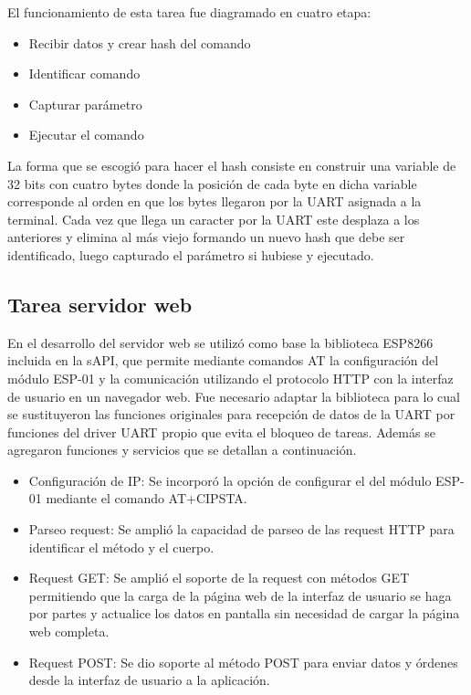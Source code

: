 El funcionamiento de esta tarea fue diagramado en cuatro etapa:
\begin{itemize}
	\item Recibir datos y crear hash del comando
	\item Identificar comando
	\item Capturar parámetro
	\item Ejecutar el comando
\end{itemize}	

La forma que se escogió para hacer el hash consiste en construir una variable de 32 bits con cuatro bytes donde la posición de cada byte en dicha variable corresponde al orden en que los bytes llegaron por la UART asignada a la terminal. Cada vez que llega un caracter por la UART este desplaza a los anteriores y elimina al más viejo formando un nuevo hash que debe ser identificado, luego capturado el parámetro si hubiese y ejecutado.


\subsection{Tarea servidor web}
\label{sec:Servidor}

En el desarrollo del servidor web se utilizó como base la biblioteca ESP8266 incluida en la sAPI, que permite mediante comandos AT la configuración del módulo ESP-01 y la comunicación utilizando el protocolo HTTP con la interfaz de usuario en un navegador web. Fue necesario adaptar la biblioteca para lo cual se sustituyeron las  funciones originales para recepción de datos de la UART por funciones del driver UART propio que evita el bloqueo de tareas.
Además se agregaron funciones y servicios que se detallan a continuación.
\begin{itemize}
	\item Configuración de IP: Se incorporó la opción de configurar el del módulo ESP-01 mediante el comando AT+CIPSTA.
	\item Parseo request: Se amplió la capacidad de parseo de las request HTTP para identificar el método y el cuerpo.
	\item Request GET: Se amplió el soporte de la request con métodos GET permitiendo que la carga de la página web de la interfaz de usuario se haga por partes y actualice los datos en pantalla sin necesidad de cargar la página web completa.
	\item Request POST: Se dio soporte al método POST para enviar datos y órdenes desde la interfaz de usuario a la aplicación.
\end{itemize}

